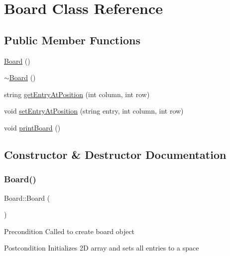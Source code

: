 \hypertarget{classBoard}{}\section{Board Class Reference}
\label{classBoard}
\subsection*{Public Member Functions}
\begin{DoxyCompactItemize}
\item 
\hyperlink{classBoard_a9ee491d4fea680cf69b033374a9fdfcb}{Board} ()
\item 
\hyperlink{classBoard_af73f45730119a1fd8f6670f53f959e68}{$\sim$\+Board} ()
\item 
string \hyperlink{classBoard_aa1985711c8014a20b04e4b8e0413a93c}{get\+Entry\+At\+Position} (int column, int row)
\item 
void \hyperlink{classBoard_a12effcd243fd9657b221360afbf8b3ea}{set\+Entry\+At\+Position} (string entry, int column, int row)
\item 
void \hyperlink{classBoard_aca49f093314a104381d05998bbf62f7f}{print\+Board} ()
\end{DoxyCompactItemize}


\subsection{Constructor \& Destructor Documentation}
\mbox{\label{classBoard_a9ee491d4fea680cf69b033374a9fdfcb}} 
\subsubsection{\texorpdfstring{Board()}{Board()}}
{\footnotesize\ttfamily Board\+::\+Board (\begin{DoxyParamCaption}{ }\end{DoxyParamCaption})}

\begin{DoxyPrecond}{Precondition}
Called to create board object 
\end{DoxyPrecond}
\begin{DoxyPostcond}{Postcondition}
Initializes 2D array and sets all entries to a space 
\end{DoxyPostcond}
\mbox{\label{classBoard_af73f45730119a1fd8f6670f53f959e68}} 
